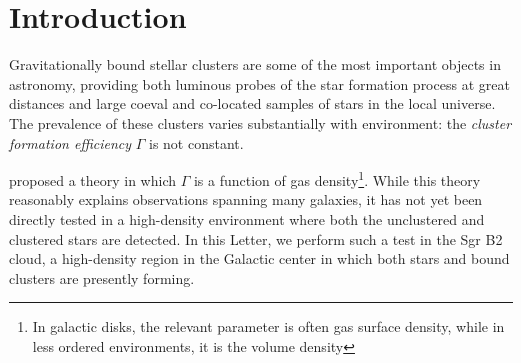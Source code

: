 \documentclass[twocolumn]{aastex62}
\begin{document}
\title{}


\author{Adam Ginsburg}

\author{J.~M.\ Diederik Kruijssen}



\begin{abstract}
    The fraction of stars forming in dense, gravitationally bound clusters is
    an important parameter in understanding both the star formation history of
    the universe and the effects of stellar feedback from groups of stars.
    (maybe something about the K+ theory)
    We report a measurement of the cluster formation efficiency (CFE), the
    fraction of stars forming in clusters, in the highest-density region in
    the Galaxy, Sgr B2.  We find that about a third of the stars (37-43\%) in
    Sgr B2 are forming in bound clusters, a value consistent with the
    predictions of the \citet{Kruijssen2012a} models.
\end{abstract}

\section{Introduction}
Gravitationally bound stellar clusters are some of the most important objects
in astronomy, providing both luminous probes of the star formation process at
great distances and large coeval and co-located samples of stars in the local
universe.  The prevalence of these clusters varies substantially with
environment: the \emph{cluster formation efficiency} $\Gamma$ is not constant.

\citet{Kruijssen2012a} proposed a theory in which $\Gamma$ is a function of gas
density\footnote{In galactic disks, the relevant parameter is often gas surface
density, while in less ordered environments, it is the volume density}.  While
this theory reasonably explains observations spanning many galaxies, it has not
yet been directly tested in a high-density environment where both the
unclustered and clustered stars are detected.  
In this Letter, we perform such a test in the Sgr B2 cloud, a high-density
region in the Galactic center in which both stars and bound clusters are presently
forming.
\end{document}

